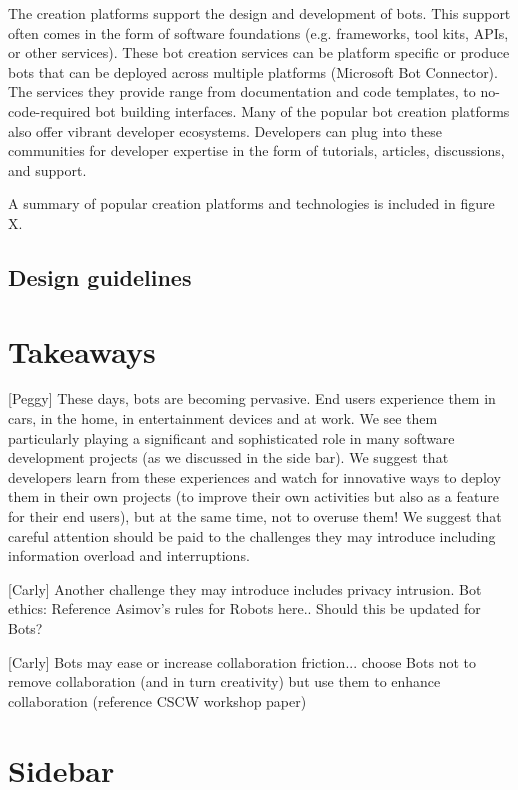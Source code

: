 \documentclass{sig-alternate}
\begin{document}
	The creation platforms support the design and development of bots. This support often comes in the form of software foundations (e.g. frameworks, tool kits, APIs, or other services). These bot creation services can be platform specific or produce bots that can be deployed across multiple platforms (Microsoft Bot Connector). The services they provide range from documentation and code templates, to no-code-required bot building interfaces. 
	Many of the popular bot creation platforms also offer vibrant developer ecosystems. Developers can plug into these communities for developer expertise in the form of tutorials, articles, discussions, and support.

	A summary of popular creation platforms and technologies is included in figure X.

	\subsection{Design guidelines}


\section{Takeaways}

[Peggy]
These days, bots are becoming pervasive.  End users experience them in cars, in the home, in entertainment devices and at work.  We see them particularly playing a significant and sophisticated role in many software development projects (as we discussed in the side bar).  
We suggest that developers learn from these experiences and watch for innovative ways to deploy them in their own projects (to improve their own activities but also as a feature for their end users), but at the same time, not to overuse them! 
We suggest that careful attention should be paid to the challenges they may introduce including information overload and interruptions.  
	
	[Carly]
Another challenge they may introduce includes privacy intrusion. 
	Bot ethics:  Reference Asimov's rules for Robots here..   Should this be updated for Bots?
	
	[Carly]
	Bots may ease or increase collaboration friction...  choose Bots not to remove collaboration (and in turn creativity) but use them to enhance collaboration (reference CSCW workshop paper)



\section{Sidebar}
\end{document}
